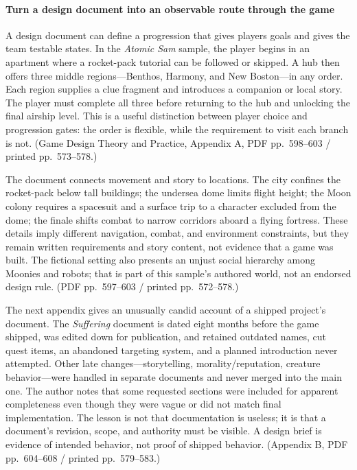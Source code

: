 \paragraph{Turn a design document into an observable route through the game}\label{05-engine-i-ch009-turn-a-design-document-into-an-observable-route-through-the-game}

\hypertarget{05-engine-i-ch009-turn-a-design-document-into-an-observable-route-through-the-game}{}

A design document can define a progression that gives players goals and gives the team testable states. In the \emph{Atomic Sam} sample, the player begins in an apartment where a rocket-pack tutorial can be followed or skipped. A hub then offers three middle regions---Benthos, Harmony, and New Boston---in any order. Each region supplies a clue fragment and introduces a companion or local story. The player must complete all three before returning to the hub and unlocking the final airship level. This is a useful distinction between player choice and progression gates: the order is flexible, while the requirement to visit each branch is not. (Game Design Theory and Practice, Appendix A, PDF pp.~598--603 / printed pp.~573--578.)

The document connects movement and story to locations. The city confines the rocket-pack below tall buildings; the undersea dome limits flight height; the Moon colony requires a spacesuit and a surface trip to a character excluded from the dome; the finale shifts combat to narrow corridors aboard a flying fortress. These details imply different navigation, combat, and environment constraints, but they remain written requirements and story content, not evidence that a game was built. The fictional setting also presents an unjust social hierarchy among Moonies and robots; that is part of this sample's authored world, not an endorsed design rule. (PDF pp.~597--603 / printed pp.~572--578.)

The next appendix gives an unusually candid account of a shipped project's document. The \emph{Suffering} document is dated eight months before the game shipped, was edited down for publication, and retained outdated names, cut quest items, an abandoned targeting system, and a planned introduction never attempted. Other late changes---storytelling, morality/reputation, creature behavior---were handled in separate documents and never merged into the main one. The author notes that some requested sections were included for apparent completeness even though they were vague or did not match final implementation. The lesson is not that documentation is useless; it is that a document's revision, scope, and authority must be visible. A design brief is evidence of intended behavior, not proof of shipped behavior. (Appendix B, PDF pp.~604--608 / printed pp.~579--583.)

